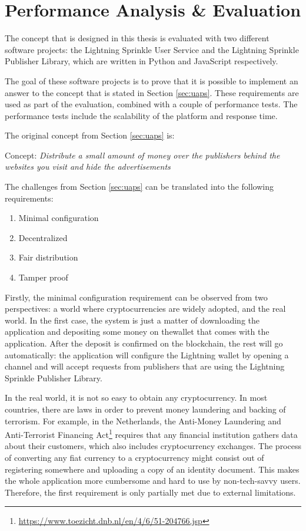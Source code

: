 \chapter{Performance Analysis \& Evaluation}
\label{cha:evaluation}

The concept that is designed in this thesis is evaluated with two different software projects: the Lightning Sprinkle User Service and the Lightning Sprinkle Publisher Library, which are written in Python and JavaScript respectively. 

The goal of these software projects is to prove that it is possible to implement an answer to the concept that is stated in Section \ref{sec:uaps}. These requirements are used as part of the evaluation, combined with a couple of performance tests. The performance tests include the scalability of the platform and response time. 

\noindent The original concept from Section \ref{sec:uaps} is:

\vspace{1em}

Concept: \textit{Distribute a small amount of money over the publishers behind the websites you visit and hide the advertisements}

\vspace{1em}

\noindent The challenges from Section \ref{sec:uaps} can be translated into the following requirements:
\begin{enumerate}
  \item Minimal configuration
  \item Decentralized
  \item Fair distribution
  \item Tamper proof
\end{enumerate}

Firstly, the minimal configuration requirement can be observed from two perspectives: a world where cryptocurrencies are widely adopted, and the real world. In the first case, the system is just a matter of downloading the application and depositing some money on thewallet that comes with the application. After the deposit is confirmed on the blockchain, the rest will go automatically: the application will configure the Lightning wallet by opening a channel and will accept requests from publishers that are using the Lightning Sprinkle Publisher Library. 

In the real world, it is not so easy to obtain any cryptocurrency. In most countries, there are laws in order to prevent money laundering and backing of terrorism. For example, in the Netherlands, the Anti-Money Laundering and Anti-Terrorist Financing Act\footnote{\url{https://www.toezicht.dnb.nl/en/4/6/51-204766.jsp}} requires that any financial institution gathers data about their customers, which also includes cryptocurrency exchanges. The process of converting any fiat currency to a cryptocurrency might consist out of registering somewhere and uploading a copy of an identity document. This makes the whole application more cumbersome and hard to use by non-tech-savvy users. Therefore, the first requirement is only partially met due to external limitations.

